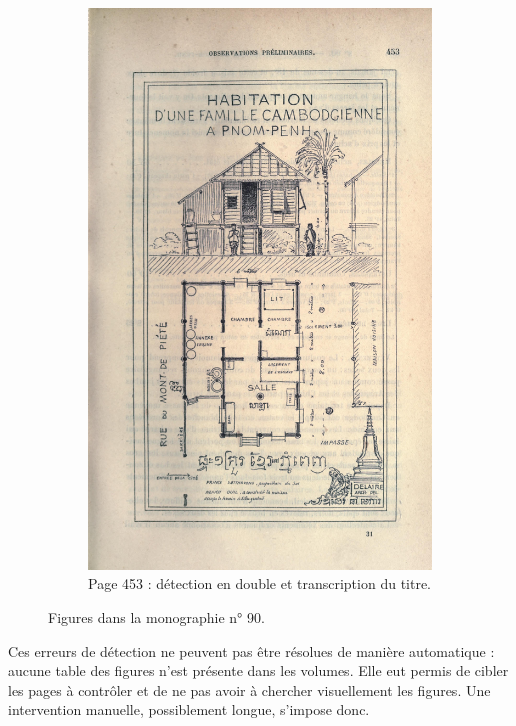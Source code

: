 \begin{figure}
\begin{subfigure}{0.4\textwidth}
     \includegraphics[width=1\linewidth]{img/odm90_453.jpg}
     \caption{Page 453 : détection en double et transcription du titre.}
     \label{fig:odmfig90453}
    \end{subfigure}
    \caption{Figures dans la monographie n° 90.}
    \label{fig:odmfig90}
\end{figure}

Ces erreurs de détection ne peuvent pas être résolues de manière automatique : aucune table des figures n'est présente dans les volumes. Elle eut permis de cibler les pages à contrôler et de ne pas avoir à chercher visuellement les figures. Une intervention manuelle, possiblement longue, s'impose donc.

